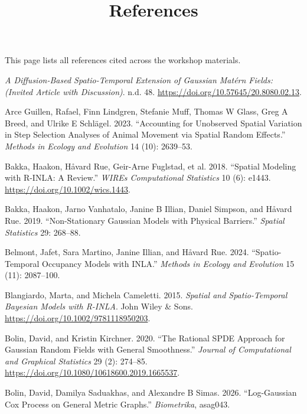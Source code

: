 \documentclass[
  letterpaper,
  DIV=11,
  numbers=noendperiod]{scrartcl}
\title{References}
\author{}
\date{}
\makeatletter
\newlength{\cslhangindent}
\newenvironment{CSLReferences}[2] %
 {\begin{list}{}{%
  \setlength{\itemindent}{0pt}
  \setlength{\leftmargin}{0pt}
  \setlength{\parsep}{0pt}
  \ifodd #1
   \setlength{\leftmargin}{\cslhangindent}
   \setlength{\itemindent}{-1\cslhangindent}
  \fi
  \setlength{\itemsep}{#2\baselineskip}}}
 {\end{list}}
\renewcommand{\maketitle}{\bgroup\setlength{\parindent}{0pt}
\begin{flushleft}
  {\sffamily\huge\textbf{\MakeUppercase{\@title}}} \vspace{0.3cm} \newline
  {\Large {\@subtitle}} \newline
  \@author
\end{flushleft}\egroup
}
\makeatother
\begin{document}
\maketitle

\pagestyle{mystyle}


This page lists all references cited across the workshop materials.

\protect{}\label{refs}
\begin{CSLReferences}{1}{1}
\emph{A Diffusion-Based Spatio-Temporal Extension of Gaussian Matérn
Fields: (Invited Article with Discussion)}. n.d. 48.
\url{https://doi.org/10.57645/20.8080.02.13}.

Arce Guillen, Rafael, Finn Lindgren, Stefanie Muff, Thomas W Glass, Greg
A Breed, and Ulrike E Schlägel. 2023. {``Accounting for Unobserved
Spatial Variation in Step Selection Analyses of Animal Movement via
Spatial Random Effects.''} \emph{Methods in Ecology and Evolution} 14
(10): 2639--53.

Bakka, Haakon, Håvard Rue, Geir-Arne Fuglstad, et al. 2018. {``Spatial
Modeling with {R-INLA}: A Review.''} \emph{WIREs Computational
Statistics} 10 (6): e1443. \url{https://doi.org/10.1002/wics.1443}.

Bakka, Haakon, Jarno Vanhatalo, Janine B Illian, Daniel Simpson, and
Håvard Rue. 2019. {``Non-Stationary Gaussian Models with Physical
Barriers.''} \emph{Spatial Statistics} 29: 268--88.

Belmont, Jafet, Sara Martino, Janine Illian, and Håvard Rue. 2024.
{``Spatio-Temporal Occupancy Models with INLA.''} \emph{Methods in
Ecology and Evolution} 15 (11): 2087--100.

Blangiardo, Marta, and Michela Cameletti. 2015. \emph{Spatial and
Spatio-Temporal {Bayesian} Models with {R-INLA}}. John Wiley \& Sons.
\url{https://doi.org/10.1002/9781118950203}.

Bolin, David, and Kristin Kirchner. 2020. {``The Rational {SPDE}
Approach for {Gaussian} Random Fields with General Smoothness.''}
\emph{Journal of Computational and Graphical Statistics} 29 (2):
274--85. \url{https://doi.org/10.1080/10618600.2019.1665537}.

Bolin, David, Damilya Saduakhas, and Alexandre B Simas. 2026.
{``Log-Gaussian Cox Process on General Metric Graphs.''}
\emph{Biometrika}, asag043.


\end{CSLReferences}
\end{document}
